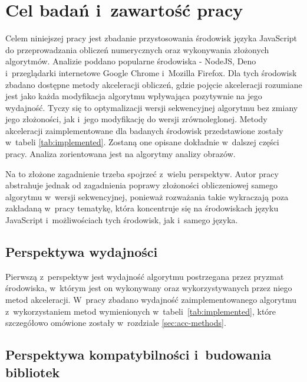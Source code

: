 
\section{Cel badań i~zawartość pracy}


 
Celem niniejszej pracy jest zbadanie przystosowania środowisk języka JavaScript do przeprowadzania obliczeń numerycznych oraz wykonywania złożonych algorytmów. Analizie poddano popularne środowiska - NodeJS, Deno i~przeglądarki internetowe Google Chrome i~Mozilla Firefox. Dla tych środowisk zbadano dostępne metody akceleracji obliczeń, gdzie pojęcie akceleracji rozumiane jest jako każda modyfikacja algorytmu wpływająca pozytywnie na jego wydajność. Tyczy się to optymalizacji wersji sekwencyjnej algorytmu bez zmiany jego złożoności, jak i~jego modyfikację do wersji zrównoleglonej. Metody akceleracji zaimplementowane dla badanych środowisk przedstawione zostały w~tabeli \ref{tab:implemented}. Zostaną one opisane dokładnie w~dalszej części pracy. Analiza zorientowana jest na algorytmy analizy obrazów.


Na to złożone zagadnienie trzeba spojrzeć z~wielu perspektyw. Autor pracy abstrahuje jednak od zagadnienia poprawy złożoności obliczeniowej samego algorytmu w~wersji sekwencyjnej, ponieważ rozważania takie wykraczają poza zakładaną w~pracy tematykę, która koncentruje się na środowiskach języku JavaScript i~możliwościach tych środowisk, jak i~samego języka.

\subsection{Perspektywa wydajności}

Pierwszą z~perspektyw jest wydajność algorytmu postrzegana przez pryzmat środowiska, w~którym jest on wykonywany oraz wykorzystywanych przez niego metod akceleracji. W~pracy zbadano wydajność zaimplementowanego algorytmu z~wykorzystaniem metod wymienionych w~tabeli~\ref{tab:implemented}, które szczegółowo omówione zostały w~rozdziale \ref{sec:acc-methods}.

\subsection{Perspektywa kompatybilności i~budowania bibliotek}

